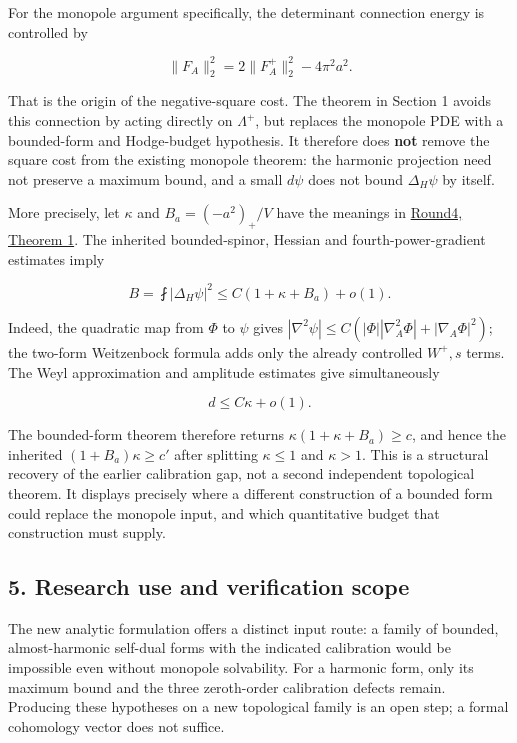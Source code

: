 \documentclass[
  10pt,
]{article}
\begin{document}
For the monopole argument specifically, the determinant connection
energy is controlled by

\[
 \|F_A\|_2^2=2\|F_A^+\|_2^2-4\pi^2a^2.
\]

That is the origin of the negative-square cost. The theorem in Section 1
avoids this connection by acting directly on \(\Lambda^+\), but replaces
the monopole PDE with a bounded-form and Hodge-budget hypothesis. It
therefore does \textbf{not} remove the square cost from the existing
monopole theorem: the harmonic projection need not preserve a maximum
bound, and a small \(d\psi\) does not bound \(\Delta_H\psi\) by itself.

More precisely, let \(\kappa\) and \(B_a=(-a^2)_+/V\) have the meanings
in \href{round4_rigidity.md}{Round4, Theorem 1}. The inherited
bounded-spinor, Hessian and fourth-power-gradient estimates imply

\[
 B=\fint|\Delta_H\psi|^2\le C(1+\kappa+B_a)+o(1).
\]

Indeed, the quadratic map from \(\Phi\) to \(\psi\) gives
\(|\nabla^2\psi|\le C(|\Phi||\nabla_A^2\Phi|+|\nabla_A\Phi|^2)\); the
two-form Weitzenbock formula adds only the already controlled \(W^+,s\)
terms. The Weyl approximation and amplitude estimates give
simultaneously

\[
                         d\le C\kappa+o(1).
\]

The bounded-form theorem therefore returns
\(\kappa(1+\kappa+B_a)\ge c\), and hence the inherited
\((1+B_a)\kappa\ge c'\) after splitting \(\kappa\le1\) and \(\kappa>1\).
This is a structural recovery of the earlier calibration gap, not a
second independent topological theorem. It displays precisely where a
different construction of a bounded form could replace the monopole
input, and which quantitative budget that construction must supply.

\hypertarget{research-use-and-verification-scope}{%
\subsection{5. Research use and verification
scope}\label{research-use-and-verification-scope}}

The new analytic formulation offers a distinct input route: a family of
bounded, almost-harmonic self-dual forms with the indicated calibration
would be impossible even without monopole solvability. For a harmonic
form, only its maximum bound and the three zeroth-order calibration
defects remain. Producing these hypotheses on a new topological family
is an open step; a formal cohomology vector does not suffice.
\end{document}
